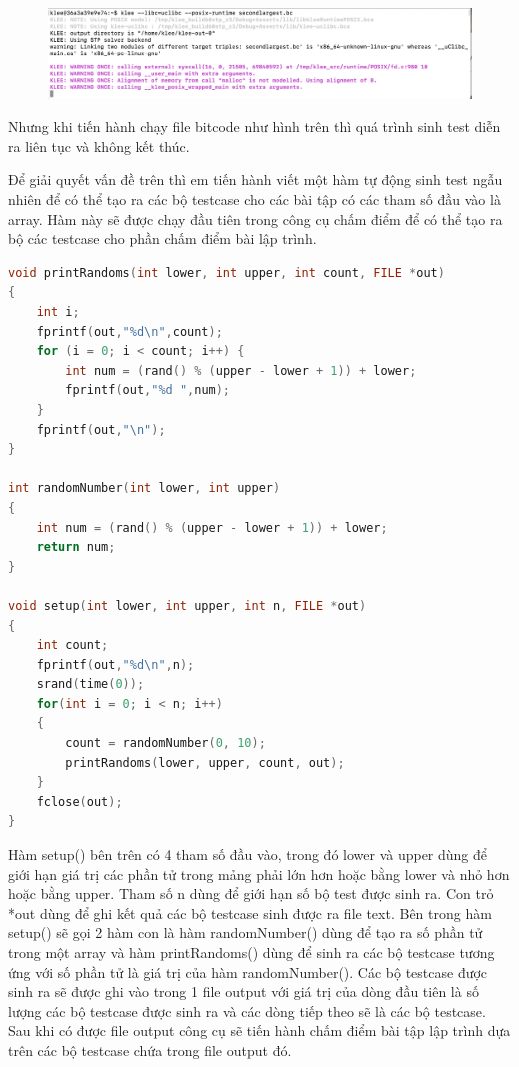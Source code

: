 \documentclass[12pt,a4paper]{report}
\begin{document}
\begin{figure}[ht]
\begin{center}
\includegraphics[scale=.3]{hinhanh/runningkleearray.png}
\end{center}
\end{figure}

Nhưng khi tiến hành chạy file bitcode như hình trên thì quá trình sinh test diễn ra liên tục và không kết thúc. 

Để giải quyết vấn đề trên thì em tiến hành viết một hàm tự động sinh test ngẫu nhiên để có thể tạo ra các bộ testcase cho các bài tập có các tham số đầu vào là array. Hàm này sẽ được chạy đầu tiên trong công cụ chấm điểm để có thể tạo ra bộ các testcase cho phần chấm điểm bài lập trình.

\begin{lstlisting}[language=c]
void printRandoms(int lower, int upper, int count, FILE *out) 
{ 
    int i;
    fprintf(out,"%d\n",count);
    for (i = 0; i < count; i++) { 
        int num = (rand() % (upper - lower + 1)) + lower; 
        fprintf(out,"%d ",num); 
    }
    fprintf(out,"\n"); 
} 

int randomNumber(int lower, int upper)
{
    int num = (rand() % (upper - lower + 1)) + lower; 
    return num;
}

void setup(int lower, int upper, int n, FILE *out)
{
    int count;
    fprintf(out,"%d\n",n);
    srand(time(0)); 
    for(int i = 0; i < n; i++)
    {
        count = randomNumber(0, 10);
        printRandoms(lower, upper, count, out);
    } 
    fclose(out);
}
\end{lstlisting}

Hàm setup() bên trên có 4 tham số đầu vào, trong đó lower và upper dùng để giới hạn giá trị các phần tử trong mảng phải lớn hơn hoặc bằng lower và nhỏ hơn hoặc bằng upper. Tham số n dùng để giới hạn số bộ test được sinh ra. Con trỏ *out dùng để ghi kết quả các bộ testcase sinh được ra file text. Bên trong hàm setup() sẽ gọi 2 hàm con là hàm randomNumber() dùng để tạo ra số phần tử trong một array và hàm printRandoms() dùng để sinh ra các bộ testcase tương ứng với số phần tử là giá trị của hàm randomNumber(). Các bộ testcase được sinh ra sẽ được ghi vào trong 1 file output với giá trị của dòng đầu tiên là số lượng các bộ testcase được sinh ra và các dòng tiếp theo sẽ là các bộ testcase.
Sau khi có được file output công cụ sẽ tiến hành chấm điểm bài tập lập trình dựa trên các bộ testcase chứa trong file output đó.
\end{document}
